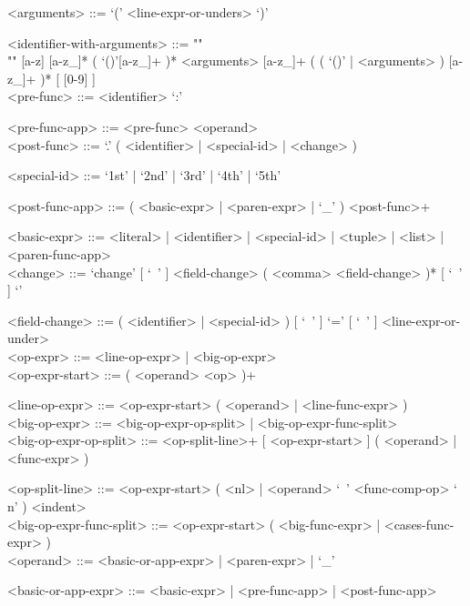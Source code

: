\documentclass{article}
\begin{document}
\begin{grammar}
<arguments> ::= `(' <line-expr-or-unders> `)'

<identifier-with-arguments> ::= ""\\""
[a-z] [a-z_]* ( `()'[a-z_]+ )* <arguments>
[a-z_]+ ( ( `()' | <arguments> ) [a-z_]+ )* 
[ [0-9] ]
\\

<pre-func> ::= <identifier> `:'

<pre-func-app> ::= <pre-func> <operand>
\\

<post-func> ::= `.' ( <identifier> | <special-id> | <change> )

<special-id> ::= `1st' | `2nd' | `3rd' | `4th' | `5th'

<post-func-app> ::= ( <basic-expr> | <paren-expr> | `_' ) <post-func>+

<basic-expr> ::=
<literal> | <identifier> | <special-id> | <tuple> | <list> | <paren-func-app>
\\

<change> ::=
`change{' [ `\ ' ] <field-change> ( <comma> <field-change> )* [ `\ ' ] `}'

<field-change> ::=
( <identifier> | <special-id> ) [ `\ ' ] `=' [ `\ ' ] <line-expr-or-under>
\\

<op-expr> ::= <line-op-expr> | <big-op-expr>
\\

<op-expr-start> ::= ( <operand> <op> )+

<line-op-expr> ::= <op-expr-start> ( <operand> | <line-func-expr> )
\\

<big-op-expr> ::= 
<big-op-expr-op-split> | <big-op-expr-func-split>
\\

<big-op-expr-op-split> ::= 
<op-split-line>+ [ <op-expr-start> ] ( <operand> | <func-expr> )

<op-split-line> ::=
<op-expr-start> ( <nl> | <operand> `\ ' <func-comp-op> `\\n' ) <indent> 
\\

<big-op-expr-func-split> ::= <op-expr-start> ( <big-func-expr> | <cases-func-expr> )
\\

<operand> ::= <basic-or-app-expr> | <paren-expr> | `_'

<basic-or-app-expr> ::= <basic-expr> | <pre-func-app> | <post-func-app>
\\


\end{grammar}
\end{document}

